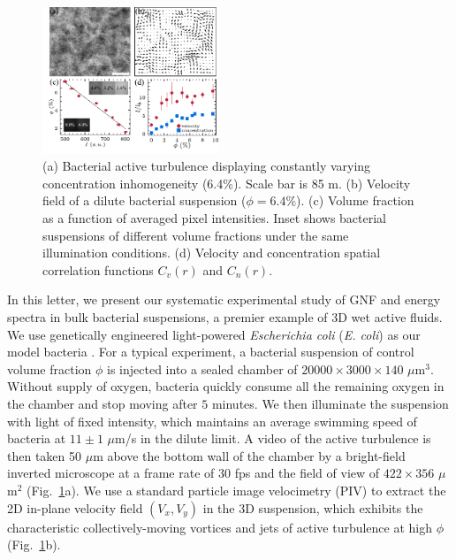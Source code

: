 \documentclass[twocolumn,aps,prl,amsmath,amssymb,longbibliography]{revtex4-2}
\begin{document}
\begin{figure}[ht]
\begin{center}
\includegraphics[width=0.47\textwidth]{Figures/experiment/v1.pdf}
\caption[Experimental details]
{
(a) Bacterial active turbulence displaying constantly varying concentration inhomogeneity (6.4\%). Scale bar is 85 \textmu m.
(b) Velocity field of a dilute bacterial suspension ($\phi=6.4\%$).
(c) Volume fraction as a function of averaged pixel intensities. Inset shows bacterial suspensions of different volume fractions under the same illumination conditions.
(d) Velocity and concentration spatial correlation functions $C_{v}(r)$ and $C_{n}(r)$.
}
\label{fig:experiment}
\end{center}
\end{figure}

In this letter, we present our systematic experimental study of GNF and energy spectra in bulk bacterial suspensions, a premier example of 3D wet active fluids. We use genetically engineered light-powered \textit{Escherichia coli} (\textit{E. coli}) as our model bacteria \cite{Liu2020}.
For a typical experiment, a bacterial suspension of control volume fraction $\phi$ is injected into a sealed chamber of $20000 \times 3000 \times 140$ $\mu$m$^3$.
Without supply of oxygen, bacteria quickly consume all the remaining oxygen in the chamber and stop moving after $5$ minutes.
We then illuminate the suspension with light
of fixed intensity, which maintains an average swimming speed of bacteria at $11 \pm 1$ $\mu$m/s in the dilute limit.
A video of the active turbulence is then taken 50 $\mu$m above the bottom wall of the chamber by a bright-field inverted microscope at a frame rate of $30$ fps and the field of view of $422 \times 356$ $\mu$m$^2$ (Fig.~\ref{fig:experiment}a).
We use a standard particle image velocimetry (PIV) to extract the 2D in-plane velocity field $(V_x,V_y)$ in the 3D suspension, which exhibits the characteristic collectively-moving vortices and jets of active turbulence at high $\phi$ (Fig.~\ref{fig:experiment}b).
\end{document}
